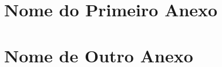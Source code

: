 
\begin{anexosenv}

\partanexos

\chapter{Nome do Primeiro Anexo}

\chapter{Nome de Outro Anexo}

\end{anexosenv}